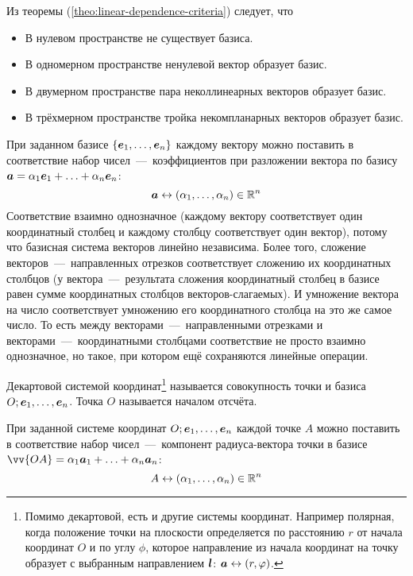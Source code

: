 \documentclass[a4paper,12pt]{article}
\begin{document}
  Из теоремы (\ref{theo:linear-dependence-criteria}) следует, что
  \begin{itemize}
    \item В нулевом пространстве не существует базиса.
    \item В одномерном пространстве ненулевой вектор образует базис.
    \item В двумерном пространстве пара неколлинеарных векторов образует базис.
    \item В трёхмерном пространстве тройка некомпланарных векторов образует базис.
  \end{itemize}
  
  \begin{remark}
    При заданном базисе $\{\boldsymbol e_1, \ldots, \boldsymbol e_n\}$ каждому вектору можно поставить в соответствие набор чисел~---~коэффициентов при разложении вектора по базису $\bds a \hm= \alpha_1 \bds e_1 \hm+ \ldots \hm+ \alpha_n \bds e_n$:
    \[
        \boldsymbol a \leftrightarrow (\alpha_1, \ldots, \alpha_n) \in \operatorname{\mathbb R}^n
    \]
    Соответствие взаимно однозначное (каждому вектору соответствует один координатный столбец и каждому столбцу соответствует один вектор), потому что базисная система векторов линейно независима.
    Более того, сложение векторов~---~направленных отрезков соответствует сложению их координатных столбцов (у вектора~---~результата сложения координатный столбец в базисе равен сумме координатных столбцов векторов-слагаемых).
    И умножение вектора на число соответствует умножению его координатного столбца на это же самое число.
    То есть между векторами~---~направленными отрезками и векторами~---~координатными столбцами соответствие не просто взаимно однозначное, но такое, при котором ещё сохраняются линейные операции.
  \end{remark}
  
  \begin{definition}
    Декартовой системой координат\footnote{Помимо декартовой, есть и другие системы координат. Например полярная, когда положение точки на плоскости определяется по расстоянию $r$ от начала координат $O$ и по углу $\phi$, которое направление из начала координат на точку образует с выбранным направлением $\boldsymbol l$: $\bds a \hm\leftrightarrow (r, \phi)$.} называется совокупность точки и базиса $O; \boldsymbol e_1, \ldots, \boldsymbol e_n$.
    Точка $O$ называется началом отсчёта.
  \end{definition}
  
  \begin{remark}
    При заданной системе координат $O; \boldsymbol e_1, \ldots, \boldsymbol e_n$ каждой точке $A$ можно поставить в соответствие набор чисел~---~компонент радиуса-вектора точки в базисе $\vv{OA} \hm= \alpha_1 \bds a_1 \hm+ \ldots \hm+ \alpha_n \bds a_n$:
    \[
      A \leftrightarrow (\alpha_1, \ldots, \alpha_n) \in \operatorname{\mathbb R}^n
    \]
  \end{remark}
  
\end{document}
